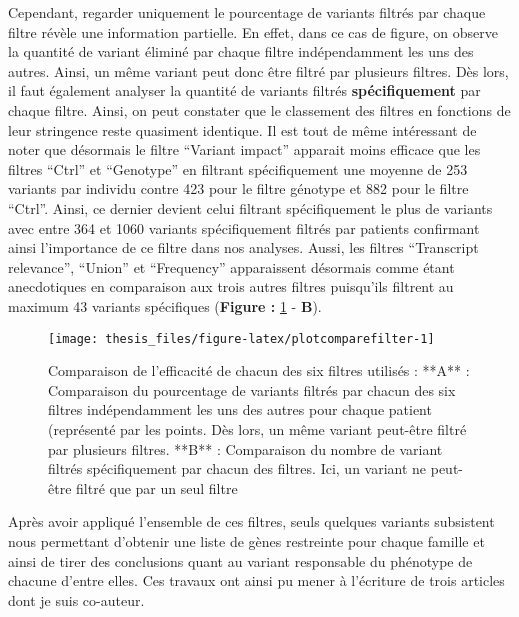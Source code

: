 \documentclass[12pt,twoside]{reedthesis}
\theoremstyle{definition}
\theoremstyle{definition}
\theoremstyle{remark}
\begin{document}
  Cependant, regarder uniquement le pourcentage de variants filtrés par
  chaque filtre révèle une information partielle. En effet, dans ce cas de
  figure, on observe la quantité de variant éliminé par chaque filtre
  indépendamment les uns des autres. Ainsi, un même variant peut donc être
  filtré par plusieurs filtres. Dès lors, il faut également analyser la
  quantité de variants filtrés \textbf{spécifiquement} par chaque filtre.
  Ainsi, on peut constater que le classement des filtres en fonctions de
  leur stringence reste quasiment identique. Il est tout de même
  intéressant de noter que désormais le filtre ``Variant impact'' apparait
  moins efficace que les filtres ``Ctrl'' et ``Genotype'' en filtrant
  spécifiquement une moyenne de 253 variants par individu contre 423 pour
  le filtre génotype et 882 pour le filtre ``Ctrl''. Ainsi, ce dernier
  devient celui filtrant spécifiquement le plus de variants avec entre 364
  et 1060 variants spécifiquement filtrés par patients confirmant ainsi
  l'importance de ce filtre dans nos analyses. Aussi, les filtres
  ``Transcript relevance'', ``Union'' et ``Frequency'' apparaissent
  désormais comme étant anecdotiques en comparaison aux trois autres
  filtres puisqu'ils filtrent au maximum 43 variants spécifiques
  (\textbf{Figure :} \ref{fig:plotcomparefilter} - \textbf{B}).
  
  \newpage
  
  \begin{figure}
  
  {\centering \texttt{[image: thesis\_files/figure-latex/plotcomparefilter-1]} 
  
  }
  
  \caption[Comparaison de l'efficacité de chacun des six filtres utilisés]{Comparaison de l'efficacité de chacun des six filtres utilisés : **A** : Comparaison du pourcentage de variants filtrés par chacun des six filtres indépendamment les uns des autres pour chaque patient (représenté par les points. Dès lors, un même variant peut-être filtré par plusieurs filtres. **B** : Comparaison du nombre de variant filtrés spécifiquement par chacun des filtres. Ici, un variant ne peut-être filtré que par un seul filtre}\label{fig:plotcomparefilter}
  \end{figure}
  
  Après avoir appliqué l'ensemble de ces filtres, seuls quelques variants
  subsistent nous permettant d'obtenir une liste de gènes restreinte pour
  chaque famille et ainsi de tirer des conclusions quant au variant
  responsable du phénotype de chacune d'entre elles. Ces travaux ont ainsi
  pu mener à l'écriture de trois articles dont je suis co-auteur.
  
\end{document}
